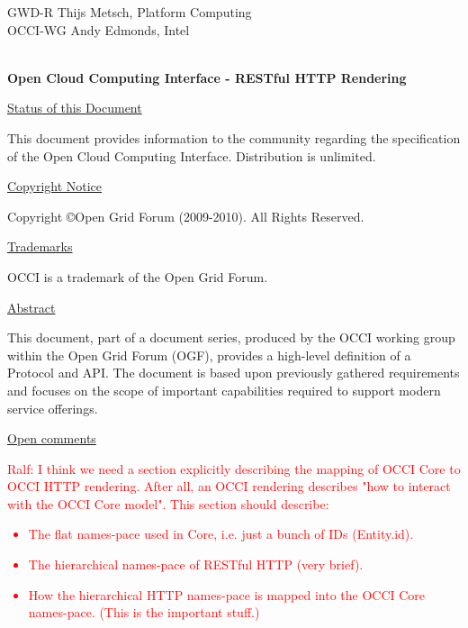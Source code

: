 \documentclass[10pt,a4paper]{article}
\newcommand{\ralf}[1]{\textcolor{red}{Ralf: #1}}
\begin{document}
\thispagestyle{empty}

GWD-R \hfill Thijs Metsch, Platform Computing\\
OCCI-WG \hfill Andy Edmonds, Intel\\
\\

\vspace*{0.5in}

\begin{Large}
\textbf{Open Cloud Computing Interface - RESTful HTTP Rendering}
\end{Large}

\vspace*{0.5in}

\underline{Status of this Document}

This document provides information to the community regarding the
specification of the Open Cloud Computing Interface. Distribution is
unlimited.

\underline{Copyright Notice}

Copyright \copyright Open Grid Forum (2009-2010). All Rights Reserved.

\underline{Trademarks}

OCCI is a trademark of the Open Grid Forum.

\underline{Abstract}

This document, part of a document series, produced by the OCCI working
group within the Open Grid Forum (OGF), provides a high-level
definition of a Protocol and API. The document is based upon
previously gathered requirements and focuses on the scope of important
capabilities required to support modern service offerings.

\underline{Open comments}

\ralf{I think we need a section explicitly describing the mapping of OCCI Core
to OCCI HTTP rendering.  After all, an OCCI rendering describes "how to
interact with the OCCI Core model". This section should describe:
\begin{itemize}
\item The flat names-pace used in Core, i.e. just a bunch of IDs (Entity.id).
\item The hierarchical names-pace of RESTful HTTP (very brief).
\item How the hierarchical HTTP names-pace is mapped into the OCCI Core
names-pace.  (This is the important stuff.)
\end{itemize}
}
\end{document}
